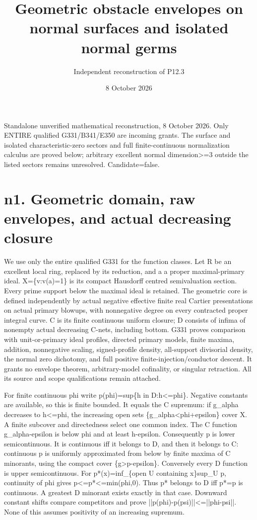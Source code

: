 \documentclass[11pt]{article}
\title{Geometric obstacle envelopes on normal surfaces and isolated normal germs}
\author{Independent reconstruction of P12.3}
\date{8 October 2026}
\begin{document}
\maketitle
Standalone unverified mathematical reconstruction, 8 October 2026. Only ENTIRE qualified G331/B341/E350 are incoming grants. The surface and isolated characteristic-zero sectors and full finite-continuous normalization calculus are proved below; arbitrary excellent normal dimension>=3 outside the listed sectors remains unresolved. Candidate=false.
\section*{n1. Geometric domain, raw envelopes, and actual decreasing closure}

We use only the entire qualified G331 for the function classes. Let R be an excellent local ring, replaced by its reduction, and a a proper maximal-primary ideal. X=\{v:v(a)=1\} is its compact Hausdorff centred semivaluation section. Every prime support below the maximal ideal is retained. The geometric core is defined independently by actual negative effective finite real Cartier presentations on actual primary blowups, with nonnegative degree on every contracted proper integral curve. C is its finite continuous uniform closure; D consists of infima of nonempty actual decreasing C-nets, including bottom. G331 proves comparison with unit-or-primary ideal profiles, directed primary models, finite maxima, addition, nonnegative scaling, signed-profile density, all-support divisorial density, the normal zero dichotomy, and full positive finite-injection/conductor descent. It grants no envelope theorem, arbitrary-model cofinality, or singular retraction. All its source and scope qualifications remain attached.

For finite continuous phi write p(phi)=sup\{h in D:h<=phi\}. Negative constants are available, so this is finite bounded. It equals the C supremum: if g\_alpha decreases to h<=phi, the increasing open sets \{g\_alpha<phi+epsilon\} cover X. A finite subcover and directedness select one common index. The C function g\_alpha-epsilon is below phi and at least h-epsilon. Consequently p is lower semicontinuous. It is continuous iff it belongs to D, and then it belongs to C: continuous p is uniformly approximated from below by finite maxima of C minorants, using the compact cover \{g>p-epsilon\}. Conversely every D function is upper semicontinuous. For p*(x)=inf\_\{open U containing x\}sup\_U p, continuity of phi gives p<=p*<=min(phi,0). Thus p* belongs to D iff p*=p is continuous. A greatest D minorant exists exactly in that case. Downward constant shifts compare competitors and prove ||p(phi)-p(psi)||<=||phi-psi||. None of this assumes positivity of an increasing supremum.
\end{document}
